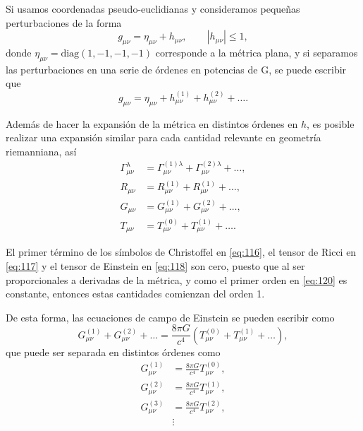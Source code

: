 Si usamos coordenadas pseudo-euclidianas y consideramos pequeñas perturbaciones de la forma
\begin{equation}
g_{\mu \nu} = \eta_{\mu \nu} + h_{\mu \nu}, \qquad |h_{\mu \nu}| \leq 1,
\end{equation}
donde $\eta_{\mu \nu} = \mathrm{diag}(1,-1,-1,-1)$ corresponde a la métrica plana, y si separamos las perturbaciones en una serie de órdenes en potencias de G, se puede escribir que
\begin{equation}
\label{eq:120}
g_{\mu \nu} = \eta_{\mu \nu} + h_{\mu \nu}^{(1)} + h_{\mu \nu}^{(2)} + \dots.
\end{equation}

Además de hacer la expansión de la métrica en distintos órdenes en $h$, es posible realizar una expansión similar para cada cantidad relevante en geometría riemanniana, así
\begin{align}
\label{eq:116}
\Gamma^{\lambda}_{\mu \nu} &= \Gamma^{(1)\lambda}_{\mu \nu} + \Gamma^{(2)\lambda}_{\mu \nu} + \dots,\\
\label{eq:117}
R_{\mu \nu} &= R_{\mu \nu}^{(1)} + R_{\mu \nu}^{(1)} + \dots,\\
\label{eq:118}
G_{\mu \nu} &= G_{\mu \nu}^{(1)} + G_{\mu \nu}^{(2)} + \dots,\\
\label{eq:119}
T_{\mu \nu} &= T_{\mu \nu}^{(0)} + T_{\mu \nu}^{(1)} + \dots.
\end{align}

El primer término de los símbolos de Christoffel en \eqref{eq:116}, el tensor de Ricci en \eqref{eq:117} y el tensor de Einstein en \eqref{eq:118} son cero, puesto que al ser proporcionales a derivadas de la métrica, y como el primer orden en \eqref{eq:120} es constante, entonces estas cantidades comienzan del orden 1.

De esta forma, las ecuaciones de campo de Einstein se pueden escribir como
\begin{equation}
G_{\mu \nu}^{(1)} + G_{\mu \nu}^{(2)} + \dots = \frac{8 \pi G}{c^4} \left( T_{\mu \nu}^{(0)} + T_{\mu \nu}^{(1)} + \dots \right),
\end{equation}
que puede ser separada en distintos órdenes como
\begin{align}
G_{\mu \nu}^{(1)} &= \frac{8 \pi G}{c^4} T_{\mu \nu}^{(0)},\\
G_{\mu \nu}^{(2)} &= \frac{8 \pi G}{c^4} T_{\mu \nu}^{(1)},\\
G_{\mu \nu}^{(3)} &= \frac{8 \pi G}{c^4} T_{\mu \nu}^{(2)},\\
\nonumber
& \vdots
\end{align}

